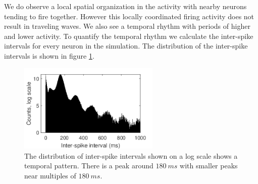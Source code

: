 \documentclass[12pt]{article}
\begin{document}
We do observe a local spatial organization in the activity with nearby neurons tending to fire together.
However this locally coordinated firing activity does not result in traveling waves.
We also see a temporal rhythm with periods of higher and lower activity.
To quantify the temporal rhythm we calculate the inter-spike intervals for every neuron in the simulation.
The distribution of the inter-spike intervals is shown in figure \ref{fig:2D1LayerRhythm}.
\begin{figure}[!htb]
 \caption{The distribution of inter-spike intervals shown on a log scale shows a temporal pattern.
          There is a peak around $180~ms$ with smaller peaks near multiples of $180~ms$.
         }
 \label{fig:2D1LayerRhythm}
 \centering
   \includegraphics[width=0.6\textwidth]{fig/2D_1Layer_ISI_log}
\end{figure}

\FloatBarrier
\end{document}

